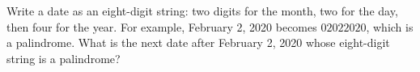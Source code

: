 Write a date as an eight-digit string: two digits for the month, two for the day, then four for the year. For example, February 2, 2020 becomes $02022020$, which is a palindrome. What is the next date after February 2, 2020 whose eight-digit string is a palindrome?
